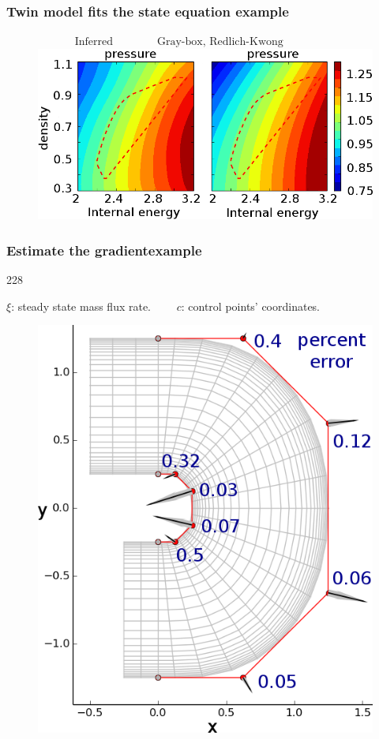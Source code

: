 \documentclass{beamer}
\newcommand{\barrow}{\item[\color{darkred}\ding{228}]}
\begin{document}
\begin{frame}
    \frametitle{Twin model fits the state equation \hfill \scriptsize{example}} \small
    \begin{figure}[H]\begin{center}
        \centering $\qquad\quad$ $\textrm{Inferred} \qquad\qquad \textrm{Gray-box, Redlich-Kwong}$
        \includegraphics[width=10.cm]{state_eqn_rk.png}
    \end{center}\end{figure}
\end{frame}

\begin{frame}
    \frametitle{Estimate the gradient\hfill \scriptsize{example}} \small
    \begin{dinglist}{228}
        \barrow
        $\xi$: steady state mass flux rate.$\qquad$ $c$: control points' coordinates.
        \begin{figure}\begin{center}
            \includegraphics[width=5.cm]{Ubend_grad_compare.png}
        \end{center}\end{figure}
    \end{dinglist}
\end{frame}
\end{document}
